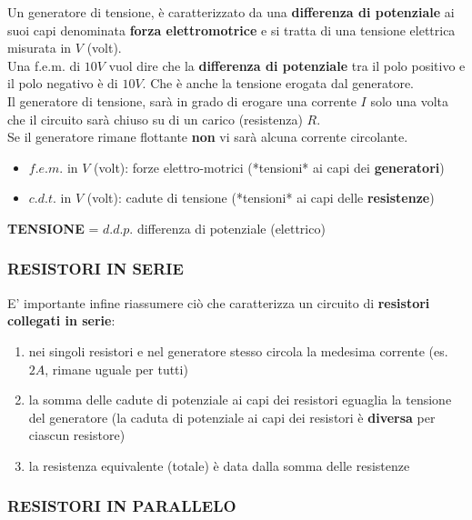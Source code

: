 \documentclass{article}
\begin{document}
Un generatore di tensione, è caratterizzato da una \textbf{differenza di potenziale} ai suoi capi denominata \textbf{forza elettromotrice} e si tratta di una tensione elettrica misurata in $V$ (volt).\\
Una f.e.m. di $10V$ vuol dire che la \textbf{differenza di potenziale} tra il polo positivo e il polo negativo è di $10V$. Che è anche la tensione erogata dal generatore.\\
Il generatore di tensione, sarà in grado di erogare una corrente $I$ solo una volta che il circuito sarà chiuso su di un carico (resistenza) $R$. \\
Se il generatore rimane flottante \textbf{non} vi sarà alcuna corrente circolante.
\begin{itemize}
  \item $f.e.m.$ in $V$ (volt): forze elettro-motrici (*tensioni* ai capi dei \textbf{generatori})
  \item $c.d.t.$ in $V$ (volt): cadute di tensione (*tensioni* ai capi delle \textbf{resistenze})
\end{itemize}


\textbf{TENSIONE} = $d.d.p.$ differenza di potenziale (elettrico)

\subsubsection{RESISTORI IN SERIE}
E' importante infine riassumere ciò che caratterizza un circuito di \textbf{resistori collegati in serie}:    
\begin{enumerate}
  \item nei singoli resistori e nel generatore stesso circola la medesima corrente (es. $2A$, rimane uguale per tutti)
  \item la somma delle cadute di potenziale ai capi dei resistori eguaglia la tensione del generatore (la caduta di potenziale ai capi dei resistori è \textbf{diversa} per ciascun resistore)
  \item la resistenza equivalente (totale) è data dalla somma delle resistenze
\end{enumerate}

\subsubsection{RESISTORI IN PARALLELO}

\end{document}
